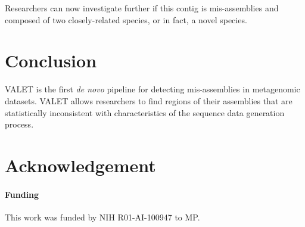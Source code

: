 \documentclass{bioinfo}
\begin{document}
Researchers can now investigate further if this contig is mis-assemblies and composed of two closely-related species, or in fact, a novel species.

\section{Conclusion}

VALET is the first \emph{de novo} pipeline for detecting mis-assemblies in metagenomic datasets.
VALET allows researchers to find regions of their assemblies that are statistically inconsistent with characteristics of the sequence data generation process.


\section*{Acknowledgement}

\paragraph{Funding\textcolon} 
This work was funded by NIH R01-AI-100947 to MP.


% 
% 
% 
% 

% 


\end{document}
